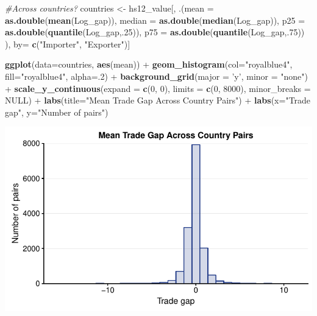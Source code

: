 \documentclass[10pt,]{article}
\newenvironment{Shaded}{\begin{snugshade}}{\end{snugshade}}
\newcommand{\KeywordTok}[1]{\textcolor[rgb]{0.13,0.29,0.53}{\textbf{{#1}}}}
\newcommand{\DataTypeTok}[1]{\textcolor[rgb]{0.13,0.29,0.53}{{#1}}}
\newcommand{\DecValTok}[1]{\textcolor[rgb]{0.00,0.00,0.81}{{#1}}}
\newcommand{\StringTok}[1]{\textcolor[rgb]{0.31,0.60,0.02}{{#1}}}
\newcommand{\CommentTok}[1]{\textcolor[rgb]{0.56,0.35,0.01}{\textit{{#1}}}}
\newcommand{\OtherTok}[1]{\textcolor[rgb]{0.56,0.35,0.01}{{#1}}}
\newcommand{\NormalTok}[1]{{#1}}
\begin{document}
\begin{Shaded}
\begin{Highlighting}[]
\CommentTok{#Across countries?}
\NormalTok{countries <-}\StringTok{ }\NormalTok{hs12_value[, .(}\DataTypeTok{mean =} \KeywordTok{as.double}\NormalTok{(}\KeywordTok{mean}\NormalTok{(Log_gap)),}
                      \DataTypeTok{median =} \KeywordTok{as.double}\NormalTok{(}\KeywordTok{median}\NormalTok{(Log_gap)),}
                      \DataTypeTok{p25 =} \KeywordTok{as.double}\NormalTok{(}\KeywordTok{quantile}\NormalTok{(Log_gap,.}\DecValTok{25}\NormalTok{)),}
                      \DataTypeTok{p75 =} \KeywordTok{as.double}\NormalTok{(}\KeywordTok{quantile}\NormalTok{(Log_gap,.}\DecValTok{75}\NormalTok{))}
\NormalTok{),}
\NormalTok{by=}\StringTok{ }\KeywordTok{c}\NormalTok{(}\StringTok{"Importer"}\NormalTok{, }\StringTok{"Exporter"}\NormalTok{)]}

\KeywordTok{ggplot}\NormalTok{(}\DataTypeTok{data=}\NormalTok{countries, }\KeywordTok{aes}\NormalTok{(mean)) +}
\StringTok{  }\KeywordTok{geom_histogram}\NormalTok{(}\DataTypeTok{col=}\StringTok{"royalblue4"}\NormalTok{,}
                 \DataTypeTok{fill=}\StringTok{"royalblue4"}\NormalTok{,}
                 \DataTypeTok{alpha=}\NormalTok{.}\DecValTok{2}\NormalTok{) +}
\StringTok{  }\KeywordTok{background_grid}\NormalTok{(}\DataTypeTok{major =} \StringTok{'y'}\NormalTok{, }\DataTypeTok{minor =} \StringTok{"none"}\NormalTok{) +}
\StringTok{  }\KeywordTok{scale_y_continuous}\NormalTok{(}\DataTypeTok{expand =} \KeywordTok{c}\NormalTok{(}\DecValTok{0}\NormalTok{, }\DecValTok{0}\NormalTok{), }\DataTypeTok{limits =} \KeywordTok{c}\NormalTok{(}\DecValTok{0}\NormalTok{, }\DecValTok{8000}\NormalTok{),  }\DataTypeTok{minor_breaks =} \OtherTok{NULL}\NormalTok{) +}
\StringTok{  }\KeywordTok{labs}\NormalTok{(}\DataTypeTok{title=}\StringTok{"Mean Trade Gap Across Country Pairs"}\NormalTok{) +}
\StringTok{  }\KeywordTok{labs}\NormalTok{(}\DataTypeTok{x=}\StringTok{"Trade gap"}\NormalTok{, }\DataTypeTok{y=}\StringTok{"Number of pairs"}\NormalTok{)}
\end{Highlighting}
\end{Shaded}

\begin{center}\includegraphics{Figs/value_time-6} \end{center}
\end{document}
